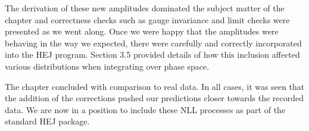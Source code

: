 The derivation of these new amplitudes dominated the subject matter of the chapter and correctness checks such as gauge invariance and limit checks were presented as we went along. Once we were happy that the amplitudes were behaving in the way we expected, there were carefully and correctly incorporated into the HEJ program. Section 3.5 provided details of how this inclusion affected various distributions when integrating over phase space. 

The chapter concluded with comparison to real data. In all cases, it was seen that the addition of the corrections pushed our predictions closer towards the recorded data. We are now in a position to include these NLL processes as part of the standard HEJ package. 
